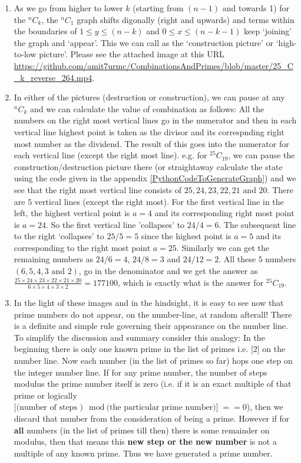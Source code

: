 \documentclass[12pt, twoside]{article}
\newcommand*{\Combination}[2]{{}^{#1}C_{#2}}%
\begin{document}
\begin{enumerate}
	\item As we go from higher to lower $k$ (starting from $(n-1)$ and towards 1) for the $\Combination{n}{k}$, the $\Combination{n}{1}$ graph shifts digonally (right and upwards) and terms within the boundaries of $ 1 \leq y \leq (n-k)$ and $0 \leq x \leq (n-k-1)$ keep `joining' the graph and `appear'. This we can call as the `construction picture' or `high-to-low picture'. Please see the attached image at this URL \url{https://github.com/amit7urmc/CombinationsAndPrimes/blob/master/25_C_k_reverse_264.mp4}.
	\item In either of the pictures (destruction or construction), we can pause at any $\Combination{n}{k}$ and we can calculate the value of combination as follows: All the numbers on the right most vertical lines go in the numerator and then in each vertical line highest point is taken as the divisor and its correspnding right most number as the dividend. The result of this goes into the numerator for each vertical line (except the right most line). e.g. for $\Combination{25}{19}$, we can pause the construction/destruction picture there (or straightaway calculate the state using the code given in the appendix \ref{PythonCodeToGenerateGraph}) and we see that the right most vertical line consists of $25, 24, 23, 22, 21 \text{ and } 20$. There are $5$ vertical lines (except the right most). For the first vertical line in the left, the highest vertical point is $a=4$ and its corresponding right most point is $a=24$. So the first vertical line 'collapses' to $24/4=6$. The subsequent line to the right `collapses' to $25/5=5$ since the highest point is $a=5$ and its corresponding to the right most point $a=25$. Similarly we can get the remaining numbers as $24/6=4$, $24/8=3$ and $24/12=2$. All these $5$ numbers $(6,5,4,3 \text{ and } 2)$, go in the denominator and we get the answer as $\frac{25\times24\times23\times22\times21\times20}{6\times5\times4\times3\times2}=177100$, which is exactly what is the answer for $\Combination{25}{19}$. 
	\item In the light of these images and in the hindsight, it is easy to see now that prime numbers do not appear, on the number-line, at random afterall! There is a definite and simple rule governing their appearance on the number line. To simplify the discussion and summary consider this analogy: 
	\subitem In the beginning there is only one known prime in the list of primes i.e. [$2$] on the number line. 
	\subitem Now each number (in the list of primes so far) hops one step on the integer number line. If for any prime number, the number of steps modulus the prime number itself is zero (i.e. if it is an exact multiple of that prime or logically $\text{[(number of steps )} \mod \text{(the particular prime number)]} == 0$), then we discard that number from the consideration of being a prime. However if for \textbf{all} numbers (in the list of primes till then) there is some remainder on modulus, then that means this \textbf{new step or the new number} is not a multiple of any known prime. Thus we have generated a prime number.

\end{enumerate}
\end{document}
